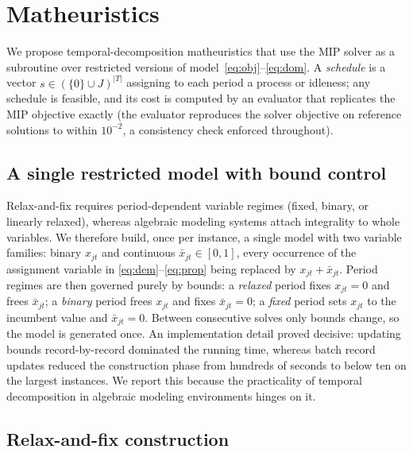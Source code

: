 \section{Matheuristics}
\label{sec:matheuristics}

We propose temporal-decomposition matheuristics that use the MIP
solver as a subroutine over restricted versions of
model~\eqref{eq:obj}--\eqref{eq:dom}. A \emph{schedule} is a vector
$s\in(\{0\}\cup J)^{|T|}$ assigning to each period a process or
idleness; any schedule is feasible, and its cost is computed by an
evaluator that replicates the MIP objective exactly (the evaluator
reproduces the solver objective on reference solutions to within
$10^{-2}$, a consistency check enforced throughout).

\subsection{A single restricted model with bound control}
\label{sec:boundcontrol}

Relax-and-fix requires period-dependent variable regimes (fixed,
binary, or linearly relaxed), whereas algebraic modeling systems
attach integrality to whole variables. We therefore build, once per
instance, a single model with two variable families: binary $x_{jt}$
and continuous $\bar{x}_{jt}\in[0,1]$, every occurrence of the
assignment variable in \eqref{eq:dem}--\eqref{eq:prop} being replaced
by $x_{jt}+\bar{x}_{jt}$. Period regimes are then governed purely by
bounds: a \emph{relaxed} period fixes $x_{jt}=0$ and frees
$\bar{x}_{jt}$; a \emph{binary} period frees $x_{jt}$ and fixes
$\bar{x}_{jt}=0$; a \emph{fixed} period sets $x_{jt}$ to the
incumbent value and $\bar{x}_{jt}=0$. Between consecutive solves only
bounds change, so the model is generated once. An implementation
detail proved decisive: updating bounds record-by-record dominated
the running time, whereas batch record updates reduced the
construction phase from hundreds of seconds to below ten on the
largest instances. We report this because the practicality of
temporal decomposition in algebraic modeling environments hinges on
it. 

\subsection{Relax-and-fix construction}
\label{sec:rf}

